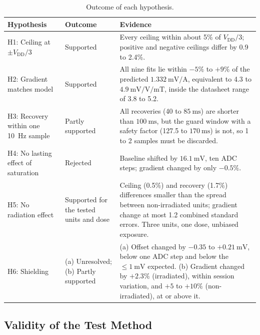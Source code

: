 \documentclass[12pt,a4paper]{article}
\begin{document}
\begin{table}[H]
\centering
\caption{Outcome of each hypothesis.}
\label{tab:hypothesis-outcomes}
\small
\begin{tabular}{@{}>{\raggedright\arraybackslash}p{}>{\raggedright\arraybackslash}p{}>{\raggedright\arraybackslash}p{}@{}}
\toprule
Hypothesis & Outcome & Evidence \\
\midrule
H1: Ceiling at $\pm V_{\text{DD}}/3$ & Supported & Every ceiling within about 5\% of $V_{\text{DD}}/3$; positive and negative ceilings differ by 0.9 to 2.4\%. \\
H2: Gradient matches model & Supported & All nine fits lie within $-5\%$ to $+9\%$ of the predicted $\SI{1.332}{\milli\volt\per\ampere}$, equivalent to 4.3 to $\SI{4.9}{\milli\volt\per\volt\per\milli\tesla}$, inside the datasheet range of 3.8 to 5.2. \\
H3: Recovery within one \SI{10}{\hertz} sample & Partly supported & All recoveries (40 to $\SI{85}{\milli\second}$) are shorter than $\SI{100}{\milli\second}$, but the guard window with a safety factor (127.5 to $\SI{170}{\milli\second}$) is not, so 1 to 2 samples must be discarded. \\
H4: No lasting effect of saturation & Rejected & Baseline shifted by $\SI{16.1}{\milli\volt}$, ten ADC steps; gradient changed by only $-0.5\%$. \\
H5: No radiation effect & Supported for the tested units and dose & Ceiling (0.5\%) and recovery (1.7\%) differences smaller than the spread between non-irradiated units; gradient change at most 1.2 combined standard errors. Three units, one dose, unbiased exposure. \\
H6: Shielding & (a) Unresolved; (b) Partly supported & (a) Offset changed by $-0.35$ to $+\SI{0.21}{\milli\volt}$, below one ADC step and below the $\le\SI{1}{\milli\volt}$ expected. (b) Gradient changed by $+2.3\%$ (irradiated), within session variation, and $+5$ to $+10\%$ (non-irradiated), at or above it. \\
\bottomrule
\end{tabular}
\end{table}

\subsection{Validity of the Test Method}
\label{sec:disc-validity}
\end{document}
